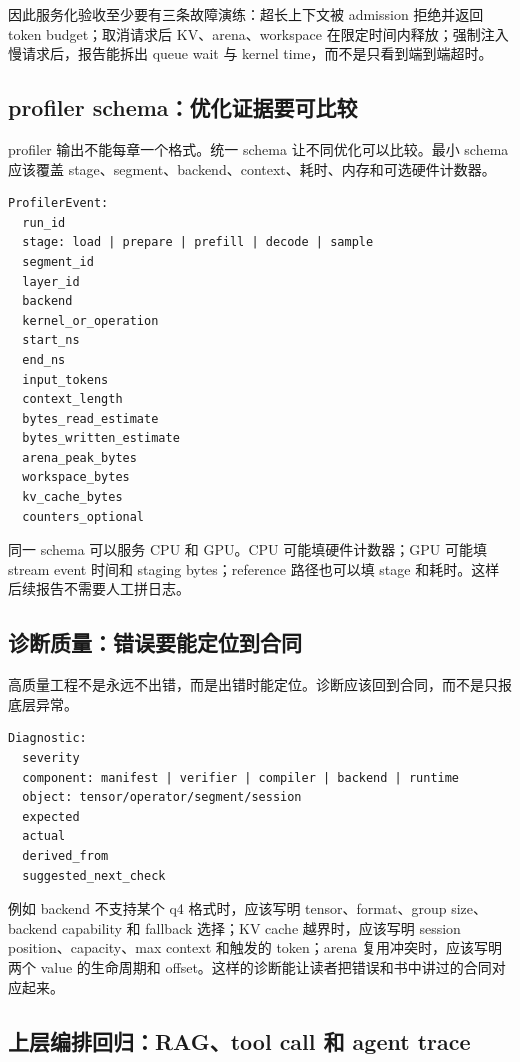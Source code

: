 因此服务化验收至少要有三条故障演练：超长上下文被 admission 拒绝并返回 token budget；取消请求后 KV、arena、workspace 在限定时间内释放；强制注入慢请求后，报告能拆出 queue wait 与 kernel time，而不是只看到端到端超时。

\subsection{profiler schema：优化证据要可比较}

profiler 输出不能每章一个格式。统一 schema 让不同优化可以比较。最小 schema 应该覆盖 stage、segment、backend、context、耗时、内存和可选硬件计数器。

\begin{lstlisting}[numbers=none,caption={统一 profiler event schema}]
ProfilerEvent:
  run_id
  stage: load | prepare | prefill | decode | sample
  segment_id
  layer_id
  backend
  kernel_or_operation
  start_ns
  end_ns
  input_tokens
  context_length
  bytes_read_estimate
  bytes_written_estimate
  arena_peak_bytes
  workspace_bytes
  kv_cache_bytes
  counters_optional
\end{lstlisting}

同一 schema 可以服务 CPU 和 GPU。CPU 可能填硬件计数器；GPU 可能填 stream event 时间和 staging bytes；reference 路径也可以填 stage 和耗时。这样后续报告不需要人工拼日志。

\subsection{诊断质量：错误要能定位到合同}

高质量工程不是永远不出错，而是出错时能定位。诊断应该回到合同，而不是只报底层异常。

\begin{lstlisting}[numbers=none,caption={诊断应该包含的信息}]
Diagnostic:
  severity
  component: manifest | verifier | compiler | backend | runtime
  object: tensor/operator/segment/session
  expected
  actual
  derived_from
  suggested_next_check
\end{lstlisting}

例如 backend 不支持某个 q4 格式时，应该写明 tensor、format、group size、backend capability 和 fallback 选择；KV cache 越界时，应该写明 session position、capacity、max context 和触发的 token；arena 复用冲突时，应该写明两个 value 的生命周期和 offset。这样的诊断能让读者把错误和书中讲过的合同对应起来。

\subsection{上层编排回归：RAG、tool call 和 agent trace}

